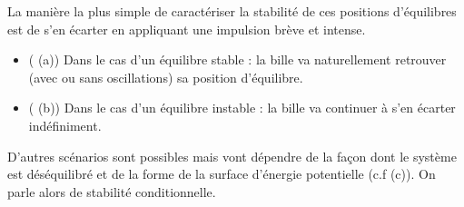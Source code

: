 La manière la plus simple de caractériser la stabilité de ces positions 
d'équilibres est de s'en écarter en appliquant une impulsion brève et intense. 
\begin{itemize}
    \item ( (a)) Dans le cas d'un équilibre stable : 
        la bille va naturellement retrouver (avec ou sans oscillations) 
        sa position d'équilibre. 
    \item ( (b)) Dans le cas d'un équilibre instable :
        la bille va continuer à s'en écarter indéfiniment. 
\end{itemize}
D'autres scénarios sont possibles mais vont dépendre de la façon dont le 
système est déséquilibré et de la forme de la surface d'énergie potentielle 
(c.f  (c)). On parle alors de stabilité conditionnelle.

